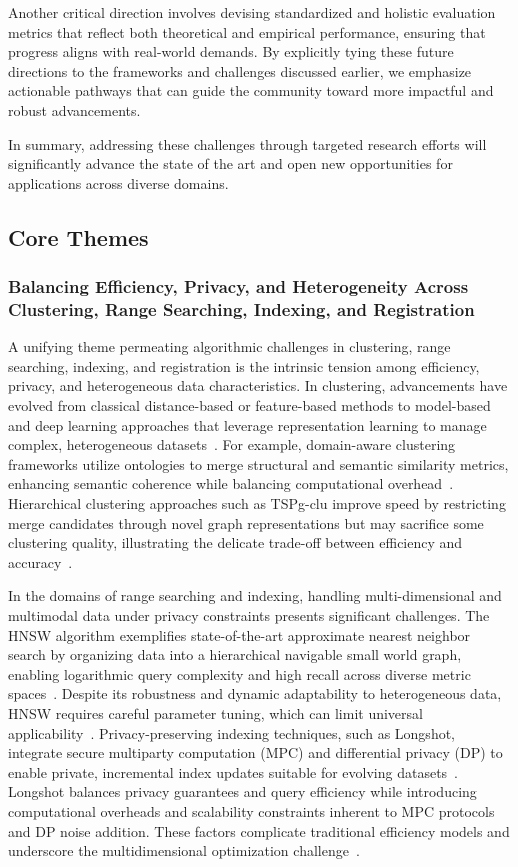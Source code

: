 \documentclass[sigconf]{acmart}
\begin{document}
Another critical direction involves devising standardized and holistic evaluation metrics that reflect both theoretical and empirical performance, ensuring that progress aligns with real-world demands. By explicitly tying these future directions to the frameworks and challenges discussed earlier, we emphasize actionable pathways that can guide the community toward more impactful and robust advancements.

In summary, addressing these challenges through targeted research efforts will significantly advance the state of the art and open new opportunities for applications across diverse domains.

\subsection{Core Themes}

\subsubsection{Balancing Efficiency, Privacy, and Heterogeneity Across Clustering, Range Searching, Indexing, and Registration}

A unifying theme permeating algorithmic challenges in clustering, range searching, indexing, and registration is the intrinsic tension among efficiency, privacy, and heterogeneous data characteristics. In clustering, advancements have evolved from classical distance-based or feature-based methods to model-based and deep learning approaches that leverage representation learning to manage complex, heterogeneous datasets~\cite{ref23}. For example, domain-aware clustering frameworks utilize ontologies to merge structural and semantic similarity metrics, enhancing semantic coherence while balancing computational overhead~\cite{ref23}. Hierarchical clustering approaches such as TSPg-clu improve speed by restricting merge candidates through novel graph representations but may sacrifice some clustering quality, illustrating the delicate trade-off between efficiency and accuracy~\cite{ref28}.

In the domains of range searching and indexing, handling multi-dimensional and multimodal data under privacy constraints presents significant challenges. The HNSW algorithm exemplifies state-of-the-art approximate nearest neighbor search by organizing data into a hierarchical navigable small world graph, enabling logarithmic query complexity and high recall across diverse metric spaces~\cite{ref4}. Despite its robustness and dynamic adaptability to heterogeneous data, HNSW requires careful parameter tuning, which can limit universal applicability~\cite{ref4}. Privacy-preserving indexing techniques, such as Longshot, integrate secure multiparty computation (MPC) and differential privacy (DP) to enable private, incremental index updates suitable for evolving datasets~\cite{ref28}. Longshot balances privacy guarantees and query efficiency while introducing computational overheads and scalability constraints inherent to MPC protocols and DP noise addition. These factors complicate traditional efficiency models and underscore the multidimensional optimization challenge~\cite{ref28,ref31}.
\end{document}
